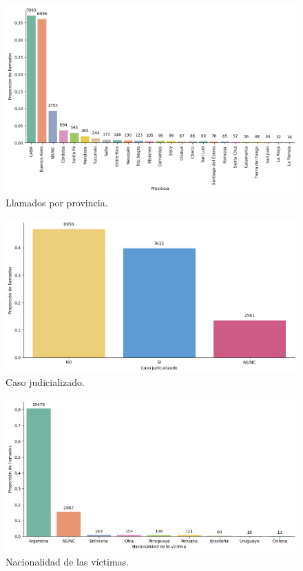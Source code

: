\documentclass[10 pt]{article}
\begin{document}
\begin{figure}[H]
\begin{center}
\includegraphics[scale=.4]{images/latex_llamados_por_provincia.png}
\caption{Llamados por provincia.}
\label{provincia}
\end{center}
\end{figure}

\begin{figure}[H]
\begin{center}
\includegraphics[scale=.4]{images/latex_caso_judicializado.png}
\caption{Caso judicializado.}
\label{casojudicializado}
\end{center}
\end{figure}


\begin{figure}[H]
\begin{center}
\includegraphics[scale=.4]{images/latex_nacionalidad_victima.png}
\caption{Nacionalidad de las víctimas.}
\label{nacionalidad}
\end{center}
\end{figure}
\end{document}
